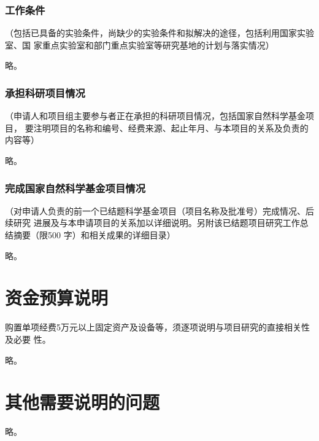 \documentclass[subfig]{mynsfc}
\begin{document}
\section{工作条件}
\label{sec:devices-laboratory}

\begin{hcomment}
  （包括已具备的实验条件，尚缺少的实验条件和拟解决的途径，包括利用国家实验室、国
  家重点实验室和部门重点实验室等研究基地的计划与落实情况）
\end{hcomment}

略。

\section{承担科研项目情况}
\label{sec:projects}

\begin{hcomment}
  （申请人和项目组主要参与者正在承担的科研项目情况，包括国家自然科学基金项目，
  要注明项目的名称和编号、经费来源、起止年月、与本项目的关系及负责的内容等）
\end{hcomment}

略。

\section{完成国家自然科学基金项目情况}
\label{sec:prev-nsfc}

\begin{hcomment}
  （对申请人负责的前一个已结题科学基金项目（项目名称及批准号）完成情况、后续研究
  进展及与本申请项目的关系加以详细说明。另附该已结题项目研究工作总结摘要（限500
  字）和相关成果的详细目录）
\end{hcomment}

略。

\part{资金预算说明}
\label{sec:finance}

\begin{hcomment}
  购置单项经费5万元以上固定资产及设备等，须逐项说明与项目研究的直接相关性及必要
  性。
\end{hcomment}

略。

\part{其他需要说明的问题}
\label{sec:others}

略。
\end{document}

